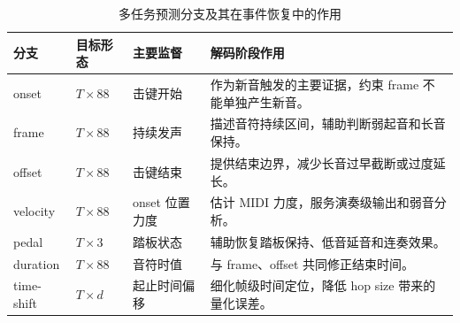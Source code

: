 \begin{table}[H]
\centering
\caption{多任务预测分支及其在事件恢复中的作用}
\label{tab:method_heads}
\small
\begin{tabularx}{\linewidth}{lllX}
\toprule
分支 & 目标形态 & 主要监督 & 解码阶段作用 \\
\midrule
onset & $T \times 88$ & 击键开始 & 作为新音触发的主要证据，约束 frame 不能单独产生新音。 \\
frame & $T \times 88$ & 持续发声 & 描述音符持续区间，辅助判断弱起音和长音保持。 \\
offset & $T \times 88$ & 击键结束 & 提供结束边界，减少长音过早截断或过度延长。 \\
velocity & $T \times 88$ & onset 位置力度 & 估计 MIDI 力度，服务演奏级输出和弱音分析。 \\
pedal & $T \times 3$ & 踏板状态 & 辅助恢复踏板保持、低音延音和连奏效果。 \\
duration & $T \times 88$ & 音符时值 & 与 frame、offset 共同修正结束时间。 \\
time-shift & $T \times d$ & 起止时间偏移 & 细化帧级时间定位，降低 hop size 带来的量化误差。 \\
\bottomrule
\end{tabularx}
\end{table}
